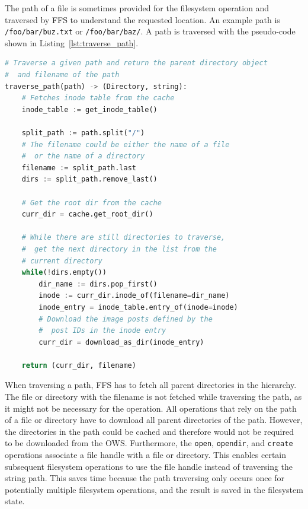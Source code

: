 The path of a file is sometimes provided for the filesystem operation and traversed by \gls{FFS} to understand the requested location. An example path is \texttt{/foo/bar/buz.txt} or \texttt{/foo/bar/baz/}. A path is traversed with the \mbox{pseudo-code} shown in Listing~\ref{lst:traverse_path}.

\begin{lstlisting}[language=python, caption={Pseudocode of traversing a given path, returning the \texttt{Directory} and the filename}, label=lst:traverse_path,breaklines=true, basicstyle=\footnotesize, float]
# Traverse a given path and return the parent directory object
#  and filename of the path
traverse_path(path) -> (Directory, string):
	# Fetches inode table from the cache
	inode_table := get_inode_table()
	
	split_path := path.split("/")
	# The filename could be either the name of a file 
	#  or the name of a directory
	filename := split_path.last
	dirs := split_path.remove_last()

	# Get the root dir from the cache
	curr_dir = cache.get_root_dir()

	# While there are still directories to traverse,
	#  get the next directory in the list from the 
	# current directory
	while(!dirs.empty())
		dir_name := dirs.pop_first()
		inode := curr_dir.inode_of(filename=dir_name)
		inode_entry = inode_table.entry_of(inode=inode)
		# Download the image posts defined by the 
		#  post IDs in the inode entry
		curr_dir = download_as_dir(inode_entry)
	
	return (curr_dir, filename)

\end{lstlisting}

When traversing a path, \gls{FFS} has to fetch all parent directories in the hierarchy. The file or directory with the filename is not fetched while traversing the path, as it might not be necessary for the operation. All operations that rely on the path of a file or directory have to download all parent directories of the path. However, the directories in the path could be cached and therefore would not be required to be downloaded from the \gls{OWS}. Furthermore, the \texttt{open}, \texttt{opendir}, and \texttt{create} operations associate a file handle with a file or directory. This enables certain subsequent filesystem operations to use the file handle instead of traversing the string path. This saves time because the path traversing only occurs once for potentially multiple filesystem operations, and the result is saved in the filesystem state.

